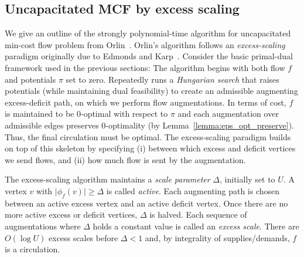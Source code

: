 \documentclass[a4paper,UKenglish]{socg-lipics-v2018}
\def\abs#1{\mathopen| #1 \mathclose|}		%
\def\fsupply{\phi}
\theoremstyle{plain}
\numberwithin{figure}{section}
\def\EMPH#1{\textcolor{BrickRed}{{\emph{#1}}}}
\begin{document}
\begin{toappendix}
\subsection{Uncapacitated MCF by excess scaling}
\label{SSA:orlin}

We give an outline of the strongly polynomial-time algorithm for uncapacitated min-cost flow problem
from Orlin~\cite{O93}.
Orlin's algorithm follows an \EMPH{excess-scaling} paradigm originally due to
Edmonds and Karp~\cite{EK72}.
Consider the basic primal-dual framework used in the previous sections:
The algorithm begins with both flow $f$ and potentials $\pi$ set to zero.
Repeatedly runs a \emph{Hungarian search} that raises potentials (while maintaining dual
feasibility) to create an admissible augmenting excess-deficit path, on which
we perform flow augmentations.
In terms of cost, $f$ is maintained to be $0$-optimal with respect to $\pi$
and each augmentation over admissible edges preserves $0$-optimality (by Lemma~\ref{lemma:eps_opt_preserve}).
Thus, the final circulation must be optimal.
The excess-scaling paradigm builds on top of this skeleton by specifying (i) between which
excess and deficit vertices we send flows, and (ii) how much flow is sent by the
augmentation.

The excess-scaling algorithm maintains a \EMPH{scale parameter} $\Delta$,
initially set to $U$.
A vertex $v$ with $\abs{\fsupply_f(v)} \geq \Delta$ is called \EMPH{active}.
Each augmenting path is chosen between an active excess vertex and an active
deficit vertex.
Once there are no more active excess or deficit vertices,
$\Delta$ is halved.
Each sequence of augmentations where $\Delta$ holds a constant value is called
an \EMPH{excess scale}.
There are $O(\log U)$ excess scales before $\Delta < 1$ and, by integrality of
supplies/demands, $f$ is a circulation.


\end{toappendix}
\end{document}
